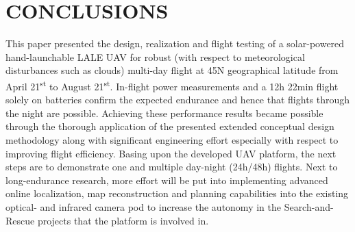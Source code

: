 \documentclass[letterpaper, 10 pt, conference]{ieeeconf}  %
\begin{document}
\section{CONCLUSIONS}
This paper presented the design, realization and flight testing of a solar-powered hand-launchable LALE UAV for robust (with respect to meteorological disturbances such as clouds) multi-day flight at 45\degree N geographical latitude from April 21\textsuperscript{st} to August 21\textsuperscript{st}. In-flight power measurements and a 12h 22min flight solely on batteries confirm the expected endurance and hence that flights through the night are possible. Achieving these performance results became possible through the thorough application of the presented extended conceptual design methodology along with significant engineering effort especially with respect to improving flight efficiency. Basing upon the developed UAV platform, the next steps are to demonstrate one and multiple day-night (24h/48h) flights. Next to long-endurance research, more effort will be put into implementing advanced online localization, map reconstruction and planning capabilities into the existing optical- and infrared camera pod to increase the autonomy in the Search-and-Rescue projects that the platform is involved in.

\addtolength{\textheight}{-12cm}   %





\end{document}
